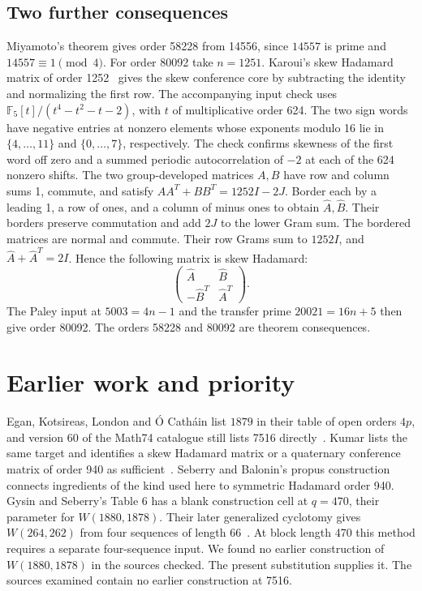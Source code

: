\documentclass[10pt]{article}
\begin{document}
\subsection{Two further consequences}

Miyamoto's theorem gives order 58228 from 14556, since $14557$ is prime and $14557\equiv1\pmod4$. For order 80092 take $n=1251$. Karoui's skew Hadamard matrix of order 1252~\cite{karoui} gives the skew conference core by subtracting the identity and normalizing the first row. The accompanying input check uses $\mathbb F_5[t]/(t^4-t^2-t-2)$, with $t$ of multiplicative order 624. The two sign words have negative entries at nonzero elements whose exponents modulo 16 lie in $\{4,\ldots,11\}$ and $\{0,\ldots,7\}$, respectively. The check confirms skewness of the first word off zero and a summed periodic autocorrelation of $-2$ at each of the 624 nonzero shifts. The two group-developed matrices $A,B$ have row and column sums 1, commute, and satisfy $AA^T+BB^T=1252I-2J$. Border each by a leading 1, a row of ones, and a column of minus ones to obtain $\widehat A,\widehat B$. Their borders preserve commutation and add $2J$ to the lower Gram sum. The bordered matrices are normal and commute. Their row Grams sum to $1252I$, and $\widehat A+\widehat A^T=2I$. Hence the following matrix is skew Hadamard:
\[
 \begin{pmatrix}
 \widehat A & \widehat B\\
 -\widehat B^T & \widehat A^T
 \end{pmatrix}.
\]
The Paley input at $5003=4n-1$ and the transfer prime $20021=16n+5$ then give order 80092. The orders 58228 and 80092 are theorem consequences.

\section{Earlier work and priority}

Egan, Kotsireas, London and \'O Cath\'ain list $1879$ in their table of open orders $4p$, and version 60 of the Math74 catalogue still lists 7516 directly~\cite{survey,math74}. Kumar lists the same target and identifies a skew Hadamard matrix or a quaternary conference matrix of order 940 as sufficient~\cite{kumar}. Seberry and Balonin's propus construction~\cite{propus} connects ingredients of the kind used here to symmetric Hadamard order 940. Gysin and Seberry's Table 6 has a blank construction cell at $q=470$, their parameter for $W(1880,1878)$. Their later generalized cyclotomy gives $W(264,262)$ from four sequences of length 66~\cite[Example~8]{gs98}. At block length 470 this method requires a separate four-sequence input. We found no earlier construction of $W(1880,1878)$ in the sources checked. The present substitution supplies it. The sources examined contain no earlier construction at 7516.
\end{document}
